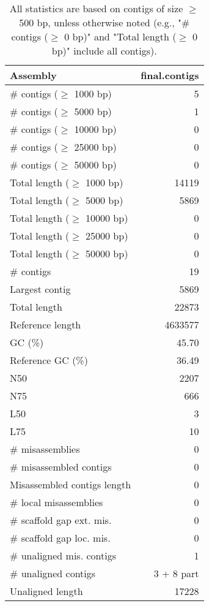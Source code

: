 \documentclass[12pt,a4paper]{article}
\begin{document}
\begin{table}[ht]
\begin{center}
\caption{All statistics are based on contigs of size $\geq$ 500 bp, unless otherwise noted (e.g., "\# contigs ($\geq$ 0 bp)" and "Total length ($\geq$ 0 bp)" include all contigs).}
\begin{tabular}{|l*{1}{|r}|}
\hline
Assembly & final.contigs \\ \hline
\# contigs ($\geq$ 1000 bp) & 5 \\ \hline
\# contigs ($\geq$ 5000 bp) & 1 \\ \hline
\# contigs ($\geq$ 10000 bp) & 0 \\ \hline
\# contigs ($\geq$ 25000 bp) & 0 \\ \hline
\# contigs ($\geq$ 50000 bp) & 0 \\ \hline
Total length ($\geq$ 1000 bp) & 14119 \\ \hline
Total length ($\geq$ 5000 bp) & 5869 \\ \hline
Total length ($\geq$ 10000 bp) & 0 \\ \hline
Total length ($\geq$ 25000 bp) & 0 \\ \hline
Total length ($\geq$ 50000 bp) & 0 \\ \hline
\# contigs & 19 \\ \hline
Largest contig & 5869 \\ \hline
Total length & 22873 \\ \hline
Reference length & 4633577 \\ \hline
GC (\%) & 45.70 \\ \hline
Reference GC (\%) & 36.49 \\ \hline
N50 & 2207 \\ \hline
N75 & 666 \\ \hline
L50 & 3 \\ \hline
L75 & 10 \\ \hline
\# misassemblies & 0 \\ \hline
\# misassembled contigs & 0 \\ \hline
Misassembled contigs length & 0 \\ \hline
\# local misassemblies & 0 \\ \hline
\# scaffold gap ext. mis. & 0 \\ \hline
\# scaffold gap loc. mis. & 0 \\ \hline
\# unaligned mis. contigs & 1 \\ \hline
\# unaligned contigs & 3 + 8 part \\ \hline
Unaligned length & 17228 \\ \hline

\end{tabular}
\end{center}
\end{table}
\end{document}
